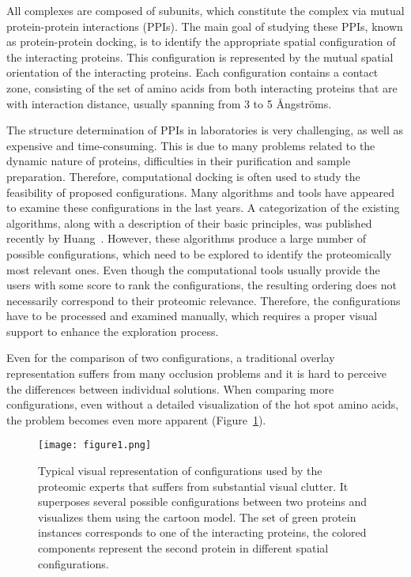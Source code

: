 \documentclass[twocolumn]{bmcart}%
\begin{document}
All complexes are composed of subunits, which constitute the complex via mutual protein-protein interactions (PPIs).
The main goal of studying these PPIs, known as protein-protein docking, is to identify the appropriate spatial configuration of the interacting proteins.
This configuration is represented by the mutual spatial orientation of the interacting proteins.
Each configuration contains a contact zone, consisting of the set of amino acids from both interacting proteins that are with interaction distance, usually spanning from 3 to 5 \AA ngstr\"{o}ms.

The structure determination of PPIs in laboratories is very challenging, as well as expensive and time-consuming.
This is due to many problems related to the dynamic nature of proteins, difficulties in their purification and sample preparation.
Therefore, computational docking is often used to study the feasibility of proposed configurations.
Many algorithms and tools have appeared to examine these configurations in the last years.
A categorization of the existing algorithms, along with a description of their basic principles, was published recently by Huang~\cite{Huang2014}.
However, these algorithms produce a large number of possible configurations, which need to be explored to identify the proteomically most relevant ones.
Even though the computational tools usually provide the users with some score to rank the configurations, the resulting ordering does not necessarily correspond to their proteomic relevance.
Therefore, the configurations have to be processed and examined manually, which requires a proper visual support to enhance the exploration process.

Even for the comparison of two configurations, a traditional overlay representation suffers from many occlusion problems and it is hard to perceive the differences between individual solutions.
When comparing more configurations, even without a detailed visualization of the hot spot amino acids, the problem becomes even more apparent (Figure~\ref{fig:problem}).

\begin{figure}[tb]
  \centering
  \texttt{[image: figure1.png]}
 \caption{
	Typical visual representation of configurations used by the proteomic experts that suffers from substantial visual clutter. It superposes several possible configurations between two proteins and visualizes them using the cartoon model. The set of green protein instances corresponds to one of the interacting proteins, the colored components represent the second protein in different spatial configurations.}
  \label{fig:problem}
\end{figure}
\end{document}

